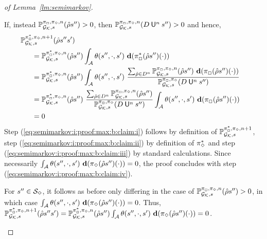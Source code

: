 \begin{proof}[of Lemma~\ref{lm:semimarkov}]
\begin{proofofclaim}
    If, instead
    $\mathbb{P}^{\pi_{{\Box}},\pi_{{\Diamond}},n}_{{\mathcal{G}_{\mathcal{K}}},s}(\hat{\rho}s'') > 0$,
    then
    $\mathbb{P}^{\pi_{{\Box}},\pi_{{\Diamond}},n}_{{\mathcal{G}_{\mathcal{K}}},s}(D \mathbin{\mathsf{U}}^n s'') > 0$
    and hence,
    \begin{align}
      \Prob^{\starredstrat_{\maxplay},\strat_{\minplay},n+1}_{\StochGK,s}(\hat{\rho}s''s')
      \hspace{-6em}\notag\\
      & =
      \Prob^{\starredstrat_{\maxplay},\strat_{\minplay},n}_{\StochGK,s}(\hat{\rho}s'')\int_{\sgactions}\sgtrans(s'',\cdot,s')\ \diff(\starredstrat_{\maxplay}(\hat{\rho}s'')(\cdot))
      \label{eq:semimarkov:i:proof:max:b:claim:i}\\
      & =
      \Prob^{\starredstrat_{\maxplay},\strat_{\minplay},n}_{\StochGK,s}(\hat{\rho}s'')
      \int_{\sgactions}\sgtrans(s'',\cdot,s')\mult
      \frac{\sum_{\hat{\rho} \in D^n} \Prob^{\strat_{\maxplay},\strat_{\minplay},n}_{\StochGK,s}(\hat{\rho}s'')\ \diff(\strat_{\maxplay}(\hat{\rho}s'')(\cdot))}{\Prob^{\strat_{\maxplay},\strat_{\minplay}}_{\StochGK,s}(D \Until^n s'')}
      \label{eq:semimarkov:i:proof:max:b:claim:ii}\\
      & =
      \Prob^{\starredstrat_{\maxplay},\strat_{\minplay},n}_{\StochGK,s}(\hat{\rho}s'')\mult
      \frac{\sum_{\hat{\rho} \in D^n} \Prob^{\strat_{\maxplay},\strat_{\minplay},n}_{\StochGK,s}(\hat{\rho}s'')}{\Prob^{\strat_{\maxplay},\strat_{\minplay}}_{\StochGK,s}(D \Until^n s'')}
      \int_{\sgactions}\sgtrans(s'',\cdot,s')\mult\diff(\strat_{\maxplay}(\hat{\rho}s'')(\cdot))
      \label{eq:semimarkov:i:proof:max:b:claim:iii}\\
      & =
      0
      \label{eq:semimarkov:i:proof:max:b:claim:iv}
    \end{align}
    Step (\ref{eq:semimarkov:i:proof:max:b:claim:i}) follows by
    definition of
    $\mathbb{P}^{\pi^*_{{\Box}},\pi_{{\Diamond}},n+1}_{{\mathcal{G}_{\mathcal{K}}},s}$,
    step (\ref{eq:semimarkov:i:proof:max:b:claim:ii}) by definition
    of $\pi^*_{{\Diamond}}$ and step
    (\ref{eq:semimarkov:i:proof:max:b:claim:iii}) by standard
    calculations.  Since necessarily
    $\int_{\sgactions}\sgtrans(s'',\cdot,s')\ \diff(\strat_{\minplay}(\hat{\rho}s'')(\cdot)) = 0$,
    the proof concludes with step
    (\ref{eq:semimarkov:i:proof:max:b:claim:iv}).

    For $s''\in\mathcal{S}_{\Diamond}$, it follows as before only
    differing in the case of
    $\mathbb{P}^{\pi_{{\Box}},\pi_{{\Diamond}},n}_{{\mathcal{G}_{\mathcal{K}}},s}(\hat{\rho}s'') > 0$,
    in which case
    $\int_{\sgactions}\sgtrans(s'',\cdot,s')\ \diff(\strat_{\minplay}(\hat{\rho}s'')(\cdot)) = 0$.
    Thus,
    $\Prob^{\starredstrat_{\maxplay},\strat_{\minplay},n+1}_{\StochGK,s}(\hat{\rho}s''s') =
    \Prob^{\starredstrat_{\maxplay},\strat_{\minplay},n}_{\StochGK,s}(\hat{\rho}s'')\int_{\sgactions}\sgtrans(s'',\cdot,s')\ \diff(\strat_{\minplay}(\hat{\rho}s'')(\cdot)) =
    0$.
    \qedclaim
  \end{proofofclaim}


\end{proof}
